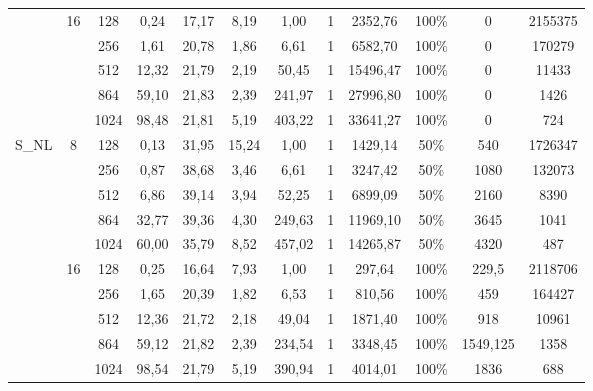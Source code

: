 \documentclass[10pt,a4paper]{article}
\begin{document}
\begin{center}
\begin{tabular}{ |c|c|c|c|c|c|c|c|c|c|c|c| }
		                        & \multirow{5}{*}{16} & 128  & 0,24   & 17,17  & 8,19   & 1,00       & 1      & 2352,76  & 100\% & 0        & 2155375 \\ \cline{3-12}
		                        &                     & 256  & 1,61   & 20,78  & 1,86   & 6,61       & 1      & 6582,70  & 100\% & 0        & 170279  \\ \cline{3-12}
		                        &                     & 512  & 12,32  & 21,79  & 2,19   & 50,45      & 1      & 15496,47 & 100\% & 0        & 11433   \\ \cline{3-12}
		                        &                     & 864  & 59,10  & 21,83  & 2,39   & 241,97     & 1      & 27996,80 & 100\% & 0        & 1426    \\ \cline{3-12}
		                        &                     & 1024 & 98,48  & 21,81  & 5,19   & 403,22     & 1      & 33641,27 & 100\% & 0        & 724     \\ \cline{1-12}
		\multirow{10}{*}{S\_NL} & \multirow{5}{*}{8}  & 128  & 0,13   & 31,95  & 15,24  & 1,00       & 1      & 1429,14  & 50\%  & 540      & 1726347 \\ \cline{3-12}
		                        &                     & 256  & 0,87   & 38,68  & 3,46   & 6,61       & 1      & 3247,42  & 50\%  & 1080     & 132073  \\ \cline{3-12}
		                        &                     & 512  & 6,86   & 39,14  & 3,94   & 52,25      & 1      & 6899,09  & 50\%  & 2160     & 8390    \\ \cline{3-12}
		                        &                     & 864  & 32,77  & 39,36  & 4,30   & 249,63     & 1      & 11969,10 & 50\%  & 3645     & 1041    \\ \cline{3-12}
		                        &                     & 1024 & 60,00  & 35,79  & 8,52   & 457,02     & 1      & 14265,87 & 50\%  & 4320     & 487     \\ \cline{2-12}
		                        & \multirow{5}{*}{16} & 128  & 0,25   & 16,64  & 7,93   & 1,00       & 1      & 297,64   & 100\% & 229,5    & 2118706 \\ \cline{3-12}
		                        &                     & 256  & 1,65   & 20,39  & 1,82   & 6,53       & 1      & 810,56   & 100\% & 459      & 164427  \\ \cline{3-12}
		                        &                     & 512  & 12,36  & 21,72  & 2,18   & 49,04      & 1      & 1871,40  & 100\% & 918      & 10961   \\ \cline{3-12}
		                        &                     & 864  & 59,12  & 21,82  & 2,39   & 234,54     & 1      & 3348,45  & 100\% & 1549,125 & 1358    \\ \cline{3-12}
		                        &                     & 1024 & 98,54  & 21,79  & 5,19   & 390,94     & 1      & 4014,01  & 100\% & 1836     & 688     \\ \cline{1-12}
	\end{tabular}
\end{center}
\end{document}
